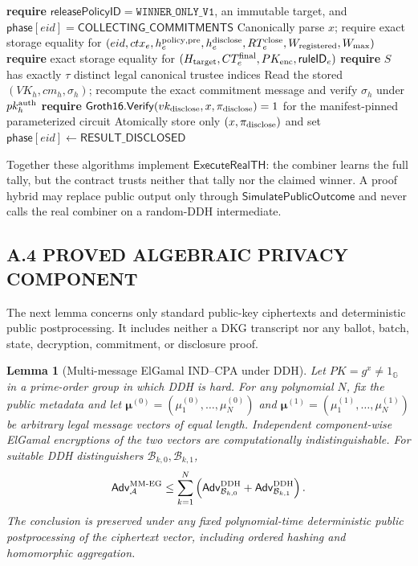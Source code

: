 \documentclass[pdflatex,sn-mathphys-num]{sn-jnl}%
\theoremstyle{thmstyleone}%
\newtheorem{lemma}[theorem]{Lemma}%
\theoremstyle{thmstyletwo}%
\theoremstyle{thmstylethree}%
\begin{document}
\begin{appendices}
\begin{algorithm}[H]
\caption{$\mathsf{AcceptWinnerDisclosure}(eid,x,\pi_{\rm disclose})$ (contract)}
\label{alg:finalize-winner-disclosure}
\begin{algorithmic}[1]
\State \textbf{require} $\mathsf{releasePolicyID}=\mathtt{WINNER\_ONLY\_V1}$, an immutable target, and $\mathsf{phase}[eid]=\mathsf{COLLECTING\_COMMITMENTS}$
\State Canonically parse $x$; require exact storage equality for $(eid,ctx_e,h_e^{\rm policy,pre},h_e^{\rm disclose},RT_e^{\rm close},W_{\rm registered},W_{\max})$
\State \textbf{require} exact storage equality for $(H_{\rm target},CT_e^{\rm final},PK_{\rm enc},\mathsf{ruleID}_e)$
\State \textbf{require} $S$ has exactly $\tau$ distinct legal canonical trustee indices
  \State Read the stored $(VK_h,cm_h,\sigma_h)$; recompute the exact commitment message and verify $\sigma_h$ under $pk_h^{\rm auth}$
\EndFor
\State \textbf{require} $\mathsf{Groth16.Verify}(vk_{\rm disclose},x,\pi_{\rm disclose})=1$ for the manifest-pinned parameterized circuit
\State Atomically store only $(x,\pi_{\rm disclose})$ and set $\mathsf{phase}[eid]\gets\mathsf{RESULT\_DISCLOSED}$
\end{algorithmic}
\end{algorithm}

Together these algorithms implement $\mathsf{ExecuteRealTH}$: the combiner
learns the full tally, but the contract trusts neither that tally nor the
claimed winner.  A proof hybrid may replace public output only through
$\mathsf{SimulatePublicOutcome}$ and never calls the real combiner on a
random-DDH intermediate.

\subsection*{A.4 PROVED ALGEBRAIC PRIVACY COMPONENT}

The next lemma concerns only standard public-key ciphertexts and deterministic
public postprocessing.  It includes neither a DKG transcript nor any ballot,
batch, state, decryption, commitment, or disclosure proof.

\begin{lemma}[Multi-message ElGamal IND--CPA under DDH]
\label{lem:multi-message-elgamal}
Let $PK=g^x\neq1_{\mathbb G}$ in a prime-order group in which DDH is hard.
For any polynomial $N$, fix the public metadata and let
$\boldsymbol\mu^{(0)}=(\mu_1^{(0)},\ldots,\mu_N^{(0)})$ and
$\boldsymbol\mu^{(1)}=(\mu_1^{(1)},\ldots,\mu_N^{(1)})$ be arbitrary legal
message vectors of equal length.  Independent component-wise ElGamal
encryptions of the two vectors are computationally indistinguishable.  For
suitable DDH distinguishers $\mathcal B_{k,0},\mathcal B_{k,1}$,
\[
 \mathsf{Adv}^{\rm MM\text{-}EG}_{\mathcal A}
 \leq\sum_{k=1}^{N}\left(
  \mathsf{Adv}^{\rm DDH}_{\mathcal B_{k,0}}+
  \mathsf{Adv}^{\rm DDH}_{\mathcal B_{k,1}}\right).
\]
The conclusion is preserved under any fixed polynomial-time deterministic
public postprocessing of the ciphertext vector, including ordered hashing and
homomorphic aggregation.
\end{lemma}


\end{appendices}
\end{document}
